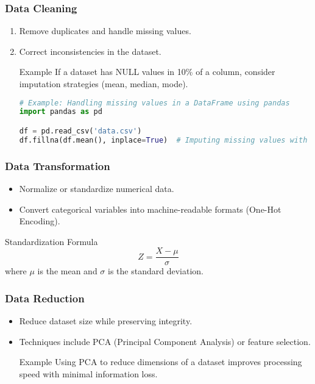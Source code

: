 \documentclass[aspectratio=169]{beamer}
\begin{document}
\begin{frame}
    \frametitle{Data Cleaning}
    \begin{enumerate}
        \item Remove duplicates and handle missing values.
        \item Correct inconsistencies in the dataset.
        \begin{block}{Example}
            If a dataset has NULL values in 10\% of a column, consider imputation strategies (mean, median, mode).
        \end{block}
        \begin{lstlisting}[language=Python]
# Example: Handling missing values in a DataFrame using pandas
import pandas as pd

df = pd.read_csv('data.csv')
df.fillna(df.mean(), inplace=True)  # Imputing missing values with the mean
        \end{lstlisting}
    \end{enumerate}
\end{frame}

\begin{frame}
    \frametitle{Data Transformation}
    \begin{itemize}
        \item Normalize or standardize numerical data.
        \item Convert categorical variables into machine-readable formats (One-Hot Encoding).
    \end{itemize}
    \begin{block}{Standardization Formula}
        \begin{equation}
            Z = \frac{X - \mu}{\sigma}
        \end{equation}
        where $\mu$ is the mean and $\sigma$ is the standard deviation.
    \end{block}
\end{frame}

\begin{frame}
    \frametitle{Data Reduction}
    \begin{itemize}
        \item Reduce dataset size while preserving integrity.
        \item Techniques include PCA (Principal Component Analysis) or feature selection.
        \begin{block}{Example}
            Using PCA to reduce dimensions of a dataset improves processing speed with minimal information loss.
        \end{block}
    \end{itemize}
\end{frame}
\end{document}
